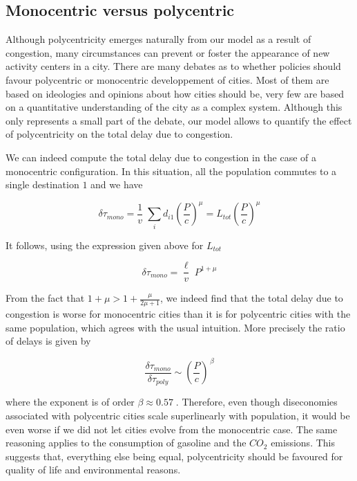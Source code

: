 \subsection{Monocentric versus polycentric}

Although polycentricity emerges naturally from our model as a result of congestion, many circumstances can prevent or foster the appearance of new activity centers in a city. There are many debates as to whether policies should favour polycentric or monocentric developpement of cities. Most of them are based on ideologies and opinions about how cities should be, very few are based on a quantitative understanding of the city as a complex system. Although this only represents a small part of the debate, our model allows to quantify the effect of polycentricity on the total delay due to congestion.

We can indeed compute the total delay due to congestion in the case of a monocentric configuration. In this situation, all the population commutes to a single destination $1$ and we have

\begin{equation}
    \delta \tau_{mono} = \frac{1}{v}\; \sum_i d_{i1} \left(\frac{P}{c} \right)^\mu = L_{tot} \left(\frac{P}{c} \right)^\mu
\end{equation}

It follows, using the expression given above for $L_{tot}$

\begin{equation}
    \delta\tau_{mono} = \frac{\ell}{v}\; P^{1+\mu}
\end{equation}

From the fact that $1+\mu > 1+\frac{\mu}{2\mu+1}$, we indeed find that the total delay due to
congestion is worse for monocentric cities than it is for polycentric cities with the same population, which agrees with the usual intuition. More precisely the ratio of delays is given by

\begin{equation}
    \frac{\delta\tau_{mono}}{\delta\tau_{poly}}\sim
    \left(\frac{P}{c}\right)^{\,\beta}
\end{equation}

where the exponent is of order $\beta \approx 0.57\;$. Therefore, even though diseconomies associated with polycentric cities scale superlinearly with population, it would be even worse if we did not let cities evolve from the monocentric case. The same reasoning applies to the consumption of gasoline and the $CO_2$ emissions. This suggests that, everything else being equal, polycentricity should be favoured for quality of life and environmental reasons.


